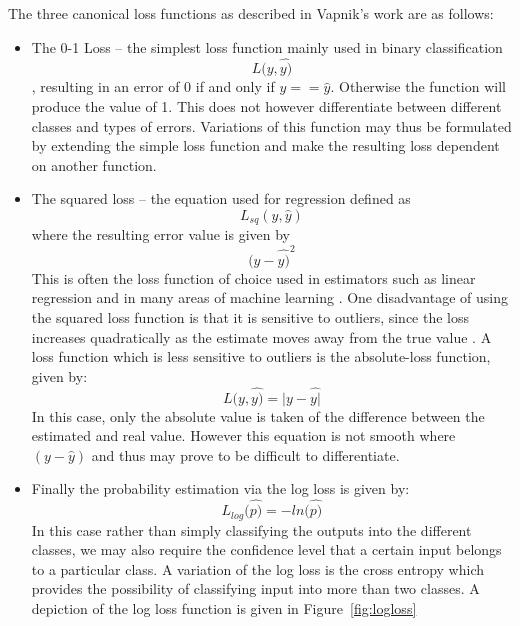 The three canonical loss functions as described in Vapnik’s \citep{vapnik1998statistical} work are as follows:
\begin{itemize} \item The 0-1 Loss – the simplest loss function mainly used in binary classification \begin{equation} L(y,\hat{y)} \end{equation}, resulting in an error of 0 if and only if $y == \hat{y}$. Otherwise the function will produce the value of 1. This does not however differentiate between different classes and types of errors. Variations of this function may thus be formulated by extending the simple loss function and make the resulting loss dependent on another function.
\item The squared loss – the equation used for regression defined as \begin{equation} L_{sq}(y,\hat{y}) \end{equation}  where the resulting error value is given by \begin{equation} (y-\hat{y)}^{2} \end{equation} This is often the loss function of choice used in estimators such as linear regression and in many areas of machine learning \citep {Davidson-Pilon:2015:BMH:2851115}. One disadvantage of using the squared loss function is that it is sensitive to outliers, since the loss increases quadratically as the estimate moves away from the true value \citep {Davidson-Pilon:2015:BMH:2851115}. A loss function which is less sensitive to outliers is the absolute-loss function, given by: \begin{equation} L(y,\hat{y)}=|y-\hat{y|}\end{equation} In this case, only the absolute value is taken of the difference between the estimated and real value. However this equation is not smooth where $(y-\hat{y})$ and thus may prove to be difficult to differentiate. 
\item Finally the probability estimation via the log loss is given by: \begin{equation} L_{log}(\hat{p)}=-ln(\hat{p)} \end{equation} In this case rather than simply classifying the outputs into the different classes, we may also require the confidence level that a certain input belongs to a particular class. A variation of the log loss is the cross entropy which provides the possibility of classifying input into more than two classes. A depiction of the log loss function is given in Figure~\ref{fig:logloss}
\end{itemize}


